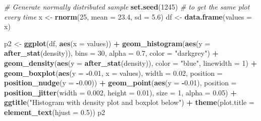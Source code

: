 \documentclass[
]{book}
\newenvironment{Shaded}{\begin{snugshade}}{\end{snugshade}}
\newcommand{\AttributeTok}[1]{\textcolor[rgb]{0.13,0.29,0.53}{#1}}
\newcommand{\CommentTok}[1]{\textcolor[rgb]{0.56,0.35,0.01}{\textit{#1}}}
\newcommand{\DecValTok}[1]{\textcolor[rgb]{0.00,0.00,0.81}{#1}}
\newcommand{\FloatTok}[1]{\textcolor[rgb]{0.00,0.00,0.81}{#1}}
\newcommand{\FunctionTok}[1]{\textcolor[rgb]{0.13,0.29,0.53}{\textbf{#1}}}
\newcommand{\NormalTok}[1]{#1}
\newcommand{\OtherTok}[1]{\textcolor[rgb]{0.56,0.35,0.01}{#1}}
\newcommand{\SpecialCharTok}[1]{\textcolor[rgb]{0.81,0.36,0.00}{\textbf{#1}}}
\newcommand{\StringTok}[1]{\textcolor[rgb]{0.31,0.60,0.02}{#1}}
\begin{document}
\begin{Shaded}
\begin{Highlighting}[]
\CommentTok{\# Generate normally distributed sample}
\FunctionTok{set.seed}\NormalTok{(}\DecValTok{1245}\NormalTok{) }\CommentTok{\# to get the same plot every time}
\NormalTok{x }\OtherTok{\textless{}{-}} \FunctionTok{rnorm}\NormalTok{(}\DecValTok{25}\NormalTok{, }\AttributeTok{mean =} \FloatTok{23.4}\NormalTok{, }\AttributeTok{sd =} \FloatTok{5.6}\NormalTok{)}
\NormalTok{df }\OtherTok{\textless{}{-}} \FunctionTok{data.frame}\NormalTok{(}\AttributeTok{values =}\NormalTok{ x)}

\NormalTok{p2 }\OtherTok{\textless{}{-}} \FunctionTok{ggplot}\NormalTok{(df, }\FunctionTok{aes}\NormalTok{(}\AttributeTok{x =}\NormalTok{ values)) }\SpecialCharTok{+}
  \FunctionTok{geom\_histogram}\NormalTok{(}\FunctionTok{aes}\NormalTok{(}\AttributeTok{y =} \FunctionTok{after\_stat}\NormalTok{(density)),}
                 \AttributeTok{bins =} \DecValTok{30}\NormalTok{, }\AttributeTok{alpha =} \FloatTok{0.7}\NormalTok{, }\AttributeTok{color =} \StringTok{"darkgrey"}\NormalTok{) }\SpecialCharTok{+}
  \FunctionTok{geom\_density}\NormalTok{(}\FunctionTok{aes}\NormalTok{(}\AttributeTok{y =} \FunctionTok{after\_stat}\NormalTok{(density)), }\AttributeTok{color =} \StringTok{"blue"}\NormalTok{, }\AttributeTok{linewidth =} \DecValTok{1}\NormalTok{) }\SpecialCharTok{+}
  \FunctionTok{geom\_boxplot}\NormalTok{(}\FunctionTok{aes}\NormalTok{(}\AttributeTok{y =} \SpecialCharTok{{-}}\FloatTok{0.01}\NormalTok{, }\AttributeTok{x =}\NormalTok{ values), }\AttributeTok{width =} \FloatTok{0.02}\NormalTok{,}
               \AttributeTok{position =} \FunctionTok{position\_nudge}\NormalTok{(}\AttributeTok{y =} \SpecialCharTok{{-}}\FloatTok{0.00}\NormalTok{)) }\SpecialCharTok{+}
  \FunctionTok{geom\_point}\NormalTok{(}\FunctionTok{aes}\NormalTok{(}\AttributeTok{y =} \SpecialCharTok{{-}}\FloatTok{0.01}\NormalTok{),}
             \AttributeTok{position =} \FunctionTok{position\_jitter}\NormalTok{(}\AttributeTok{width =} \FloatTok{0.002}\NormalTok{, }\AttributeTok{height =} \FloatTok{0.01}\NormalTok{),}
             \AttributeTok{size =} \DecValTok{1}\NormalTok{, }\AttributeTok{alpha =} \FloatTok{0.05}\NormalTok{) }\SpecialCharTok{+}
  \FunctionTok{ggtitle}\NormalTok{(}\StringTok{"Histogram with density plot and boxplot below"}\NormalTok{) }\SpecialCharTok{+}
  \FunctionTok{theme}\NormalTok{(}\AttributeTok{plot.title =} \FunctionTok{element\_text}\NormalTok{(}\AttributeTok{hjust =} \FloatTok{0.5}\NormalTok{))}
\NormalTok{p2}
\end{Highlighting}
\end{Shaded}
\end{document}
